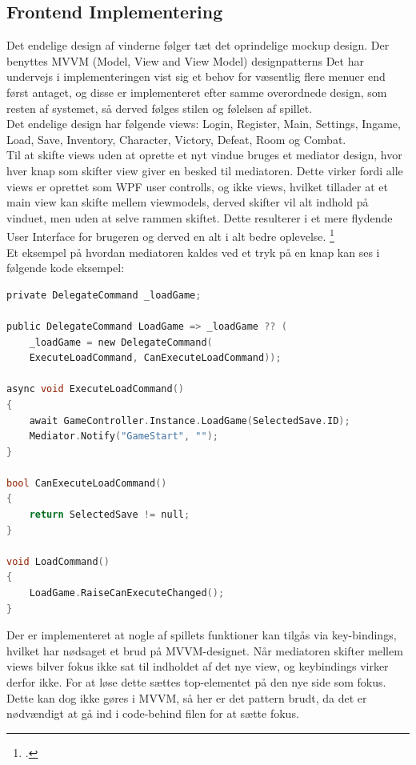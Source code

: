 \subsection{Frontend Implementering}
\label{sec:Frontend Implementering}
Det endelige design af vinderne følger tæt det oprindelige mockup design. Der benyttes MVVM (Model, View and View Model) designpatterns  Det har undervejs i implementeringen vist sig et behov for væsentlig flere menuer end først antaget, og disse er implementeret efter samme overordnede design, som resten af systemet, så derved følges stilen og følelsen af spillet.\\
Det endelige design har følgende views:
Login, Register, Main, Settings, Ingame, Load, Save, Inventory, Character, Victory, Defeat, Room og Combat.\\
Til at skifte views uden at oprette et nyt vindue bruges et mediator design, hvor hver knap som skifter view giver en besked til mediatoren. Dette virker fordi alle views er oprettet som WPF user controlls, og ikke views, hvilket tillader at et main view kan skifte mellem viewmodels, derved skifter vil alt indhold på vinduet, men uden at selve rammen skiftet. Dette resulterer i et mere flydende User Interface for brugeren og derved en alt i alt bedre oplevelse. \footcite{https://www.technical-recipes.com/2018/navigating-between-views-in-wpf-mvvm/}\\
Et eksempel på hvordan mediatoren kaldes ved et tryk på en knap kan ses i følgende kode eksempel:

\begin{lstlisting}[language=c]
private DelegateCommand _loadGame;
    
public DelegateCommand LoadGame => _loadGame ?? (
	_loadGame = new DelegateCommand(
	ExecuteLoadCommand, CanExecuteLoadCommand));

async void ExecuteLoadCommand()
{
    await GameController.Instance.LoadGame(SelectedSave.ID);
    Mediator.Notify("GameStart", "");
}

bool CanExecuteLoadCommand()
{
    return SelectedSave != null;
}

void LoadCommand()
{
    LoadGame.RaiseCanExecuteChanged();
}
\end{lstlisting}

\noindent Der er implementeret at nogle af spillets funktioner kan tilgås via key-bindings, hvilket har nødsaget et brud på MVVM-designet. Når mediatoren skifter mellem views bilver fokus ikke sat til indholdet af det nye view, og keybindings virker derfor ikke. For at løse dette sættes top-elementet på den nye side som fokus. Dette kan dog ikke gøres i MVVM, så her er det pattern brudt, da det er nødvændigt at gå ind i code-behind filen for at sætte fokus.

